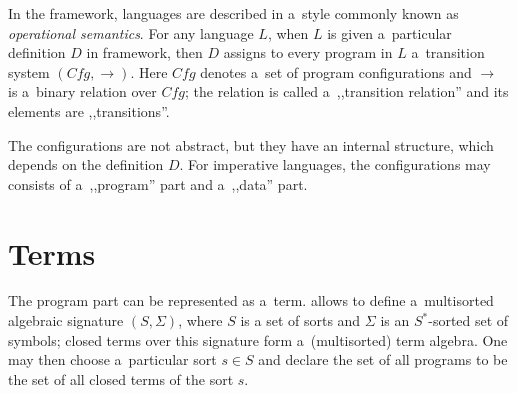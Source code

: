 \documentclass[nolot,nolof,nocover,printed]{fithesis3}
\newcommand{\var}[1]{\mathit{#1}\xspace}
\begin{document}


In the \K framework, languages are described in a~style commonly known as \textit{operational semantics}. For any language $\var{L}$, when $\var{L}$ is given a~particular definition $\var{D}$ in \K framework, then $\var{D}$ assigns to every program in $\var{L}$ a~transition system $( \var{Cfg}, \rightarrow )$. Here $\var{Cfg}$ denotes a~set of program configurations and $\rightarrow$ is a~binary relation over $\var{Cfg}$; the relation is called a~,,transition relation'' and its elements are ,,transitions''. %


The configurations are not abstract, but they have an internal structure, which depends on the definition $\var{D}$. 
For imperative languages, the configurations may consists of a~,,program'' part and a~,,data'' part.

\section{Terms}

The program part can be represented as a~term. \K allows to define a~multisorted algebraic signature $(S, \Sigma)$, where $S$ is a set of sorts and $\Sigma$ is an $S^*$-sorted set of symbols; closed terms over this signature form a~(multisorted) term algebra. One may then choose a~particular sort $s \in S$ and declare the set of all programs to be the set of all closed terms of the sort $s$.
\end{document}
